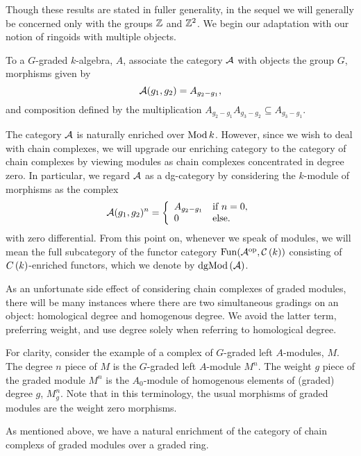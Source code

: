 Though these results are stated in fuller generality, in the sequel we will generally be concerned only with the groups \(\mathbb{Z}\) and \(\mathbb{Z}^2\).
We begin our adaptation with our notion of ringoids with multiple objects.

\begin{definition}
  To a \(G\)-graded \(k\)-algebra, \(A\), associate the category \(\mathcal{A}\) with objects the group \(G\), morphisms given by
  \[\mathcal{A}(g_1, g_2) = A_{g_2 - g_1},\]
  and composition defined by the multiplication \(A_{g_2 - g_1}A_{g_3 - g_2} \subseteq A_{g_3 - g_1}\).
\end{definition}

The category $\mathcal{A}$ is naturally enriched over $\operatorname{Mod}k$.
However, since we wish to deal with chain complexes, we will upgrade our enriching category to the category of chain complexes by viewing modules as chain complexes concentrated in degree zero.
In particular, we regard \(\mathcal{A}\) as a dg-category by considering the \(k\)-module of morphisms as the complex
$$\mathcal{A}(g_1,g_2)^n = \left\{
\begin{array}{ll}
  A_{g_2 - g_1} & \text{if}\ n = 0,\\
  0 & \text{else}.
\end{array}
\right.$$
with zero differential.
From this point on, whenever we speak of modules, we will mean the full subcategory of the functor category $\operatorname{Fun}(\mathcal{A}^{\operatorname{op}},\mathcal{C}\left(k\right))$ consisting of $C\left(k\right)$-enriched functors, which we denote by $\operatorname{dgMod}\left(\mathcal{A}\right)$.

As an unfortunate side effect of considering chain complexes of graded modules, there will be many instances where there are two simultaneous gradings on an object: homological degree and homogenous degree. 
We avoid the latter term, preferring weight, and use degree solely when referring to homological degree.

For clarity, consider the example of a complex of \(G\)-graded left \(A\)-modules, \(M\).
The degree \(n\) piece of \(M\) is the \(G\)-graded left \(A\)-module \(M^n\).
The weight \(g\) piece of the graded module \(M^n\) is the \(A_0\)-module of homogenous elements of (graded) degree \(g\), \(M^n_g\).
Note that in this terminology, the usual morphisms of graded modules are the weight zero morphisms.

As mentioned above, we have a natural enrichment of the category of chain complexs of graded modules over a graded ring.

